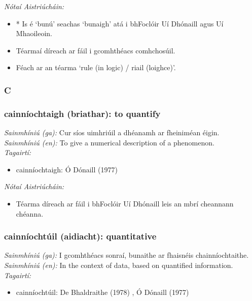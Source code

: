  \noindent \textit{Nótaí Aistriúcháin:}
\begin{itemize}
	\item * Is é `bunú' seachas `bunaigh' atá i bhFoclóir Uí Dhónaill agus Uí Mhaoileoin.
	\item Téarmaí díreach ar fáil i gcomhthéacs comhchosúil.
	\item Féach ar an téarma `rule (in logic) / riail (loighce)'.
\end{itemize}


 \subsubsection*{C}

\subsubsection*{cainníochtaigh (briathar): to quantify}
 \noindent \textit{Sainmhíniú (ga):} Cur síos uimhriúil a dhéanamh ar fheiniméan éigin.
\\
 \noindent \textit{Sainmhíniú (en):} To give a numerical description of a phenomenon.
\\
 \noindent \textit{Tagairtí:}
\begin{itemize}
	\item cainníochtaigh: Ó Dónaill (1977) \cite{odonaill}
\end{itemize}

 \noindent \textit{Nótaí Aistriúcháin:}
\begin{itemize}
	\item Téarma díreach ar fáil i bhFoclóir Uí Dhónaill leis an mbrí cheannann chéanna.
\end{itemize}


\subsubsection*{cainníochtúil (aidiacht): quantitative}
 \noindent \textit{Sainmhíniú (ga):} I gcomhthéacs sonraí, bunaithe ar fhaisnéis chainníochtaithe.
\\
 \noindent \textit{Sainmhíniú (en):} In the context of data, based on quantified information.
\\
 \noindent \textit{Tagairtí:}
\begin{itemize}
	\item cainníochtúil: De Bhaldraithe (1978) \cite{de-bhaldraithe}, Ó Dónaill (1977) \cite{odonaill}
\end{itemize}

